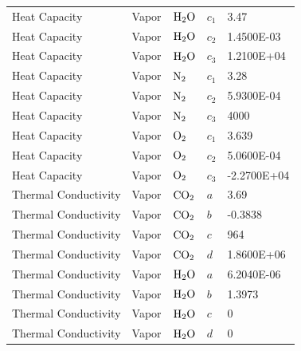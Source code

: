 \documentclass[a4paper,fleqn]{cas-sc}
\begin{document}
\begin{longtable}{lllll}
        Heat Capacity             & Vapor          & $\ce{H2O}$          & $c_1$             & 3.47           \\
        Heat Capacity             & Vapor          & $\ce{H2O}$          & $c_2$             & 1.4500E-03     \\
        Heat Capacity             & Vapor          & $\ce{H2O}$          & $c_3$             & 1.2100E+04     \\
        Heat Capacity             & Vapor          & $\ce{N2}$           & $c_1$             & 3.28           \\
        Heat Capacity             & Vapor          & $\ce{N2}$           & $c_2$             & 5.9300E-04     \\
        Heat Capacity             & Vapor          & $\ce{N2}$           & $c_3$             & 4000           \\
        Heat Capacity             & Vapor          & $\ce{O2}$           & $c_1$             & 3.639          \\
        Heat Capacity             & Vapor          & $\ce{O2}$           & $c_2$             & 5.0600E-04     \\
        Heat Capacity             & Vapor          & $\ce{O2}$           & $c_3$             & -2.2700E+04    \\
        Thermal Conductivity      & Vapor          & $\ce{CO2}$          & $a$               & 3.69           \\
        Thermal Conductivity      & Vapor          & $\ce{CO2}$          & $b$               & -0.3838        \\
        Thermal Conductivity      & Vapor          & $\ce{CO2}$          & $c$               & 964            \\
        Thermal Conductivity      & Vapor          & $\ce{CO2}$          & $d$               & 1.8600E+06     \\
        Thermal Conductivity      & Vapor          & $\ce{H2O}$          & $a$               & 6.2040E-06     \\
        Thermal Conductivity      & Vapor          & $\ce{H2O}$          & $b$               & 1.3973         \\
        Thermal Conductivity      & Vapor          & $\ce{H2O}$          & $c$               & 0              \\
        Thermal Conductivity      & Vapor          & $\ce{H2O}$          & $d$               & 0              \\

\end{longtable}
\end{document}
